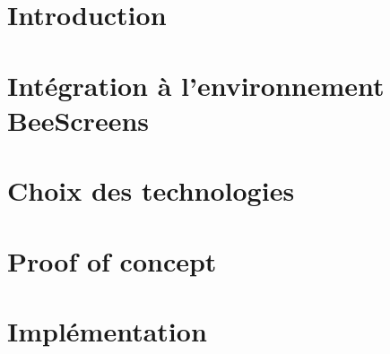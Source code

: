 \documentclass[
    iict, %
    il, %
]{heig-tb}
\begin{document}
\maketitle
\frontmatter
\clearemptydoublepage

\preamble
\authentification

%   

\clearemptydoublepage
{
  \tableofcontents
  \let\cleardoublepage\clearpage
  \listoffigures
  \let\cleardoublepage\clearpage
  \listoftables
  \let\cleardoublepage\clearpage
  \listoflistings
}

\printnomenclature
\clearemptydoublepage
{}

\mainmatter
\chapter{Introduction}


\chapter{Intégration à l'environnement BeeScreens}


\chapter{Choix des technologies}


% 

\chapter{Proof of concept}


\chapter{Implémentation}
\label{implementation}


\end{document}
